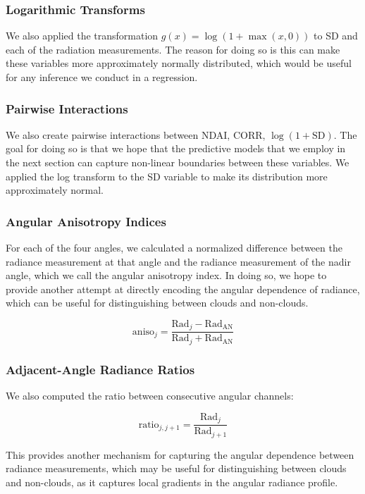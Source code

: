 \documentclass[11pt,letterpaper]{article}
\begin{document}
\subsubsection{Logarithmic Transforms}

We also applied the transformation $g(x) = \log(1+\max(x, 0))$ to SD and each of the radiation measurements. The reason for doing so is this can make these variables more approximately normally distributed, which would be useful for any inference we conduct in a regression.

\subsubsection{Pairwise Interactions}

We also create pairwise interactions between NDAI, CORR, $\log(1+\text{SD})$. The goal for doing so is that we hope that the predictive models that we employ in the next section can capture non-linear boundaries between these variables. We applied the log transform to the SD variable to make its distribution more approximately normal.

\subsubsection{Angular Anisotropy Indices}

For each of the four angles, we calculated a normalized difference between the radiance measurement at that angle and the radiance measurement of the nadir angle, which we call the angular anisotropy index. In doing so, we hope to provide another attempt at directly encoding the angular dependence of radiance, which can be useful for distinguishing between clouds and non-clouds.

$$
\text{aniso}_j=\frac{\text{Rad}_j-\text{Rad}_{\text{AN}}}{\text{Rad}_j+\text{Rad}_{\text{AN}}}
$$

\subsubsection{Adjacent-Angle Radiance Ratios}

We also computed the ratio between consecutive angular channels:

$$
\text{ratio}_{j, j+1}=\frac{\text{Rad}_j}{\text{Rad}_{j+1}}
$$

This provides another mechanism for capturing the angular dependence between radiance measurements, which may be useful for distinguishing between clouds and non-clouds, as it captures local gradients in the angular radiance profile.
\end{document}
